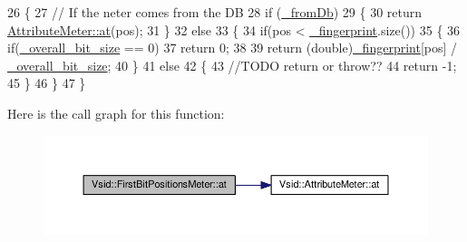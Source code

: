 \begin{DoxyCode}
26 \{
27     \textcolor{comment}{// If the neter comes from the DB}
28     \textcolor{keywordflow}{if} (\hyperlink{class_vsid_1_1_attribute_meter_a2ce3946fc699d3c375ee4019a9e3c022}{\_fromDb})
29     \{
30         \textcolor{keywordflow}{return} \hyperlink{class_vsid_1_1_attribute_meter_a3b067be638ae613a732fa090c07c5e71}{AttributeMeter::at}(pos);
31     \}
32     \textcolor{keywordflow}{else}
33     \{
34         \textcolor{keywordflow}{if}(pos < \hyperlink{class_vsid_1_1_attribute_meter_a0386b2fe9c5d6ab6fba16029d8da4efe}{\_fingerprint}.size())
35         \{
36             \textcolor{keywordflow}{if}(\hyperlink{class_vsid_1_1_first_bit_positions_meter_a2557a44d6bf953c4f352f1e465fb1f43}{\_overall\_bit\_size} == 0)
37                 \textcolor{keywordflow}{return} 0;
38 
39             \textcolor{keywordflow}{return} (\textcolor{keywordtype}{double})\hyperlink{class_vsid_1_1_attribute_meter_a0386b2fe9c5d6ab6fba16029d8da4efe}{\_fingerprint}[pos] / \hyperlink{class_vsid_1_1_first_bit_positions_meter_a2557a44d6bf953c4f352f1e465fb1f43}{\_overall\_bit\_size};
40         \}
41         \textcolor{keywordflow}{else}
42         \{
43             \textcolor{comment}{//TODO return or throw??}
44             \textcolor{keywordflow}{return} -1;
45         \}
46     \}
47 \}
\end{DoxyCode}


Here is the call graph for this function\-:
\nopagebreak
\begin{figure}[H]
\begin{center}
\leavevmode
\includegraphics[width=350pt]{class_vsid_1_1_first_bit_positions_meter_a4660f82419be36294df0ca50713da70f_cgraph}
\end{center}
\end{figure}


